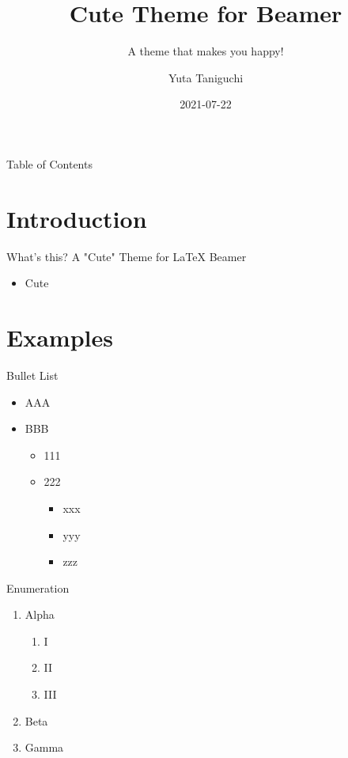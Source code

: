 \documentclass[12pt,t]{beamer}
\title[Cute Theme]{Cute Theme for Beamer}
\subtitle{A theme that makes you happy!}
\author[Y.~Taniguchi]{Yuta Taniguchi}
\institute{@yuttieyuttie}
\date{2021-07-22}
\begin{document}
{
  \frame{\titlepage}
}
\setcounter{framenumber}{0}




\begin{frame}{Table of Contents}
  \centering
  \toc
\end{frame}


\section{Introduction}
\begin{frame}{What's this?}
  \alert{A "Cute" Theme for LaTeX Beamer}
  \begin{itemize}
    \item Cute
  \end{itemize}
\end{frame}


\section{Examples}
\begin{frame}{Bullet List}
  \begin{itemize}
  \item AAA
  \item BBB
    \begin{itemize}
    \item 111
    \item 222
      \begin{itemize}
      \item xxx
      \item yyy
      \item zzz
      \end{itemize}
    \end{itemize}
  \end{itemize}
\end{frame}


\begin{frame}{Enumeration}
  \begin{enumerate}
  \item Alpha
    \begin{enumerate}
    \item I
    \item II
    \item III
    \end{enumerate}
  \item Beta
  \item Gamma
  \end{enumerate}
\end{frame}
\end{document}
